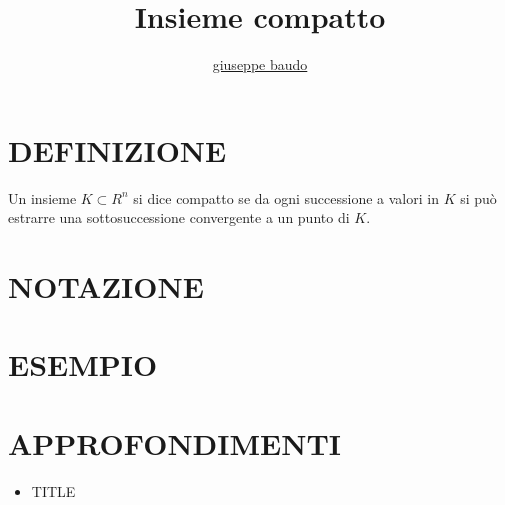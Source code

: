 \documentclass[a4paper,10pt]{article}
\title{Insieme compatto}
\author{\href{http://www.baudo.hol.es}{giuseppe baudo}}
\begin{document}
\maketitle

\section{DEFINIZIONE}
Un insieme $K \subset R^{n}$ si dice compatto se da ogni successione a valori in $K$ si può estrarre una sottosuccessione convergente a un punto di $K$.
\section{NOTAZIONE}

\section{ESEMPIO}

\section{APPROFONDIMENTI}
\begin{itemize}
 \item TITLE
\end{itemize}
\end{document}
